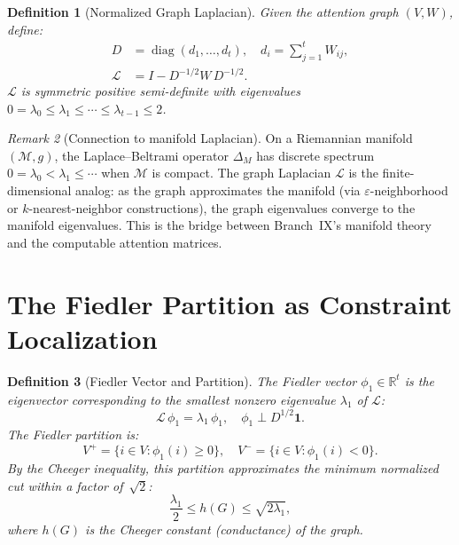 \documentclass[11pt]{article}
\newtheorem{definition}{Definition}[section]
\theoremstyle{remark}
\newtheorem{remark}[definition]{Remark}
\newcommand{\Mman}{(\mathcal{M}, g)}
\newcommand{\R}{\mathbb{R}}
\DeclareMathOperator{\diag}{diag}
\begin{document}
\begin{definition}[Normalized Graph Laplacian]\label{def:laplacian}
Given the attention graph $(V, W)$, define:
\begin{align}
  D &= \diag(d_1, \ldots, d_t), \quad d_i = \sum_{j=1}^t W_{ij}, 
  \label{eq:degree}\\
  \mathcal{L} &= I - D^{-1/2} W\, D^{-1/2}.
  \label{eq:laplacian}
\end{align}
$\mathcal{L}$ is symmetric positive semi-definite with eigenvalues 
$0 = \lambda_0 \leq \lambda_1 \leq \cdots \leq \lambda_{t-1} \leq 2$.
\end{definition}

\begin{remark}[Connection to manifold Laplacian]
On a Riemannian manifold $\Mman$, the Laplace--Beltrami operator 
$\Delta_M$ has discrete spectrum $0 = \lambda_0 < \lambda_1 \leq 
\cdots$ when $\mathcal{M}$ is compact. The graph Laplacian 
$\mathcal{L}$ is the finite-dimensional analog: as the graph 
approximates the manifold (via $\varepsilon$-neighborhood or 
$k$-nearest-neighbor constructions), the graph eigenvalues 
converge to the manifold eigenvalues. This is the bridge between 
Branch~IX's manifold theory and the computable attention matrices.
\end{remark}


\section{The Fiedler Partition as Constraint Localization}
\label{sec:fiedler_psi}

\begin{definition}[Fiedler Vector and Partition]\label{def:fiedler}
The \emph{Fiedler vector} $\phi_1 \in \R^t$ is the eigenvector 
corresponding to the smallest nonzero eigenvalue $\lambda_1$ of 
$\mathcal{L}$:
\begin{equation}\label{eq:fiedler_eigenproblem}
  \mathcal{L}\, \phi_1 = \lambda_1\, \phi_1, \quad 
  \phi_1 \perp D^{1/2}\mathbf{1}.
\end{equation}
The \emph{Fiedler partition} is:
\begin{equation}\label{eq:fiedler_partition}
  V^+ = \{i \in V : \phi_1(i) \geq 0\}, \quad 
  V^- = \{i \in V : \phi_1(i) < 0\}.
\end{equation}
By the Cheeger inequality, this partition approximates the 
minimum normalized cut within a factor of~$\sqrt{2}$:
\begin{equation}\label{eq:cheeger}
  \frac{\lambda_1}{2} \leq h(G) \leq \sqrt{2\lambda_1},
\end{equation}
where $h(G)$ is the Cheeger constant (conductance) of the graph.
\end{definition}
\end{document}

